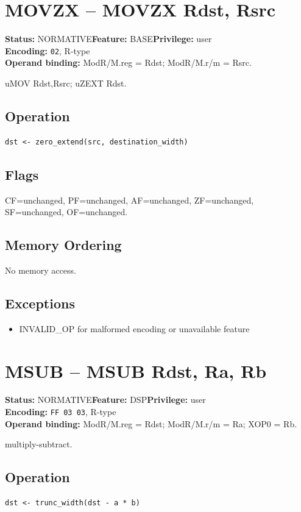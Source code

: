 \documentclass[10pt]{article}
\begin{document}
\section{MOVZX -- MOVZX Rdst, Rsrc}
\textbf{Status:} NORMATIVE\quad \textbf{Feature:} BASE\quad \textbf{Privilege:} user\\
\textbf{Encoding:} \texttt{02}, R-type\\
\textbf{Operand binding:} ModR/M.reg = Rdst; ModR/M.r/m = Rsrc.

uMOV Rdst,Rsrc; uZEXT Rdst.

\subsection*{Operation}
\begin{lstlisting}
dst <- zero_extend(src, destination_width)
\end{lstlisting}
\subsection*{Flags}
CF=unchanged, PF=unchanged, AF=unchanged, ZF=unchanged, SF=unchanged, OF=unchanged.
\subsection*{Memory Ordering}
No memory access.
\subsection*{Exceptions}
\begin{itemize}
\item INVALID\_OP for malformed encoding or unavailable feature
\end{itemize}
\clearpage

\section{MSUB -- MSUB Rdst, Ra, Rb}
\textbf{Status:} NORMATIVE\quad \textbf{Feature:} DSP\quad \textbf{Privilege:} user\\
\textbf{Encoding:} \texttt{FF 03 03}, R-type\\
\textbf{Operand binding:} ModR/M.reg = Rdst; ModR/M.r/m = Ra; XOP0 = Rb.

multiply-subtract.

\subsection*{Operation}
\begin{lstlisting}
dst <- trunc_width(dst - a * b)
\end{lstlisting}
\end{document}
